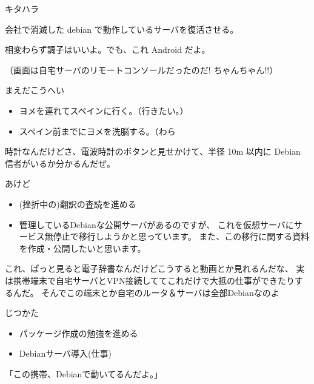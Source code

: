 \begin{prework}{キタハラ}

会社で消滅した debian で動作しているサーバを復活させる。


相変わらず調子はいいよ。でも、これ Android だよ。

（画面は自宅サーバのリモートコンソールだったのだ! ちゃんちゃん!!）

\end{prework}

\begin{prework}{まえだこうへい}

\begin{itemize}
\item ヨメを連れてスペインに行く。（行きたい。）
\item スペイン前までにヨメを洗脳する。（わら
\end{itemize}

時計なんだけどさ、電波時計のボタンと見せかけて、半径 10m 以内に Debian 信者がいるか分かるんだぜ。
\end{prework}

 
\begin{prework}{あけど}

\begin{itemize}
 \item (挫折中の)翻訳の査読を進める
 \item 管理しているDebianな公開サーバがあるのですが、
       これを仮想サーバにサービス無停止で移行しようかと思っています。
       また、この移行に関する資料を作成・公開したいと思います。       

\end{itemize}


これ、ぱっと見ると電子辞書なんだけどこうすると動画とか見れるんだな、
実は携帯端末で自宅サーバとVPN接続しててこれだけで大抵の仕事ができたりす
 るんだ。
そんでこの端末とか自宅のルータ＆サーバは全部Debianなのよ

\end{prework}

\begin{prework}{じつかた}


\begin{itemize}
 \item パッケージ作成の勉強を進める
 \item Debianサーバ導入(仕事)
\end{itemize}


 「この携帯、Debianで動いてるんだよ。」

\end{prework}


%
